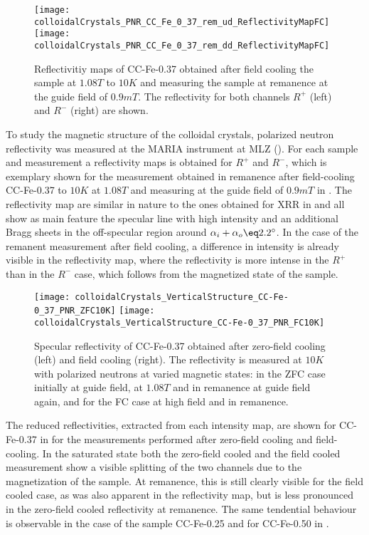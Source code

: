 \documentclass[\main/dresen_thesis.tex]{subfiles}
\begin{document}
  \label{sec:colloidalCrystals:layers:pnr}

  \begin{figure}[tb]
    \centering
    \texttt{[image: colloidalCrystals\_PNR\_CC\_Fe\_0\_37\_rem\_ud\_ReflectivityMapFC]}
    \texttt{[image: colloidalCrystals\_PNR\_CC\_Fe\_0\_37\_rem\_dd\_ReflectivityMapFC]}
    \caption{\label{fig:colloidalCrystals:pnrRemanenceMaps} Reflectivitiy maps of CC-Fe-0.37 obtained after field cooling the sample at $1.08 \unit{T}$ to $10 \unit{K}$ and measuring the sample at remanence at the guide field of $0.9 \unit{mT}$. The reflectivity for both channels $R^{+}$ (left) and $R^{-}$ (right) are shown.}
  \end{figure}

  To study the magnetic structure of the colloidal crystals, polarized neutron reflectivity was measured at the MARIA instrument at MLZ ().
  For each sample and measurement a reflectivity maps is obtained for $R^{+}$ and $R^{-}$, which is exemplary shown for the measurement obtained in remanence after field-cooling CC-Fe-0.37 to $10 \unit{K}$ at $1.08\unit{T}$ and measuring at the guide field of $0.9 \unit{mT}$ in .
  The reflectivity map are similar in nature to the ones obtained for XRR in  and all show as main feature the specular line with high intensity and an additional Bragg sheets in the off-specular region around $\alpha_i + \alpha_o \eq 2.2^\circ$.
  In the case of the remanent measurement after field cooling, a difference in intensity is already visible in the reflectivity map, where the reflectivity is more intense in the $R^{+}$ than in the $R^{-}$ case, which follows from the magnetized state of the sample.

  \begin{figure}[tb]
    \centering
    \texttt{[image: colloidalCrystals\_VerticalStructure\_CC-Fe-0\_37\_PNR\_ZFC10K]}
    \texttt{[image: colloidalCrystals\_VerticalStructure\_CC-Fe-0\_37\_PNR\_FC10K]}
    \caption{\label{fig:colloidalCrystals:pnrCCFe37}Specular reflectivity of CC-Fe-0.37 obtained after zero-field cooling (left) and field cooling (right). The reflectivity is measured at $10 \unit{K}$ with polarized neutrons at varied magnetic states: in the ZFC case initially at guide field, at $1.08 \unit{T}$ and in remanence at guide field again, and for the FC case at high field and in remanence.}
  \end{figure}

  The reduced reflectivities, extracted from each intensity map, are shown for CC-Fe-0.37 in  for the measurements performed after zero-field cooling and field-cooling.
  In the saturated state both the zero-field cooled and the field cooled measurement show a visible splitting of the two channels due to the magnetization of the sample.
  At remanence, this is still clearly visible for the field cooled case, as was also apparent in the reflectivity map, but is less pronounced in the zero-field cooled reflectivity at remanence.
  The same tendential behaviour is observable in the case of the sample CC-Fe-0.25 and for CC-Fe-0.50 in .
\end{document}
